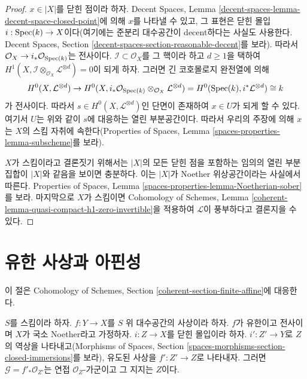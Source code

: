 \begin{proof}
\medskip\noindent
$x \in |X|$를 닫힌 점이라 하자. Decent Spaces, Lemma
\ref{decent-spaces-lemma-decent-space-closed-point}에 의해 $x$를 나타낼 수
있고, 그 표현은 닫힌 몰입 $i : \mathop{\mathrm{Spec}}(k) \to X$이다(여기에는 준분리
대수공간이 decent하다는 사실도 사용한다. Decent Spaces, Section
\ref{decent-spaces-section-reasonable-decent}를 보라). 따라서
$\mathcal{O}_X \to i_*\mathcal{O}_{\mathop{\mathrm{Spec}}(k)}$는 전사이다.
$\mathcal{I} \subset \mathcal{O}_X$를 그 핵이라 하고
$d \geq 1$을 택하여
$H^1(X, \mathcal{I} \otimes_{\mathcal{O}_X}
\mathcal{L}^{\otimes d}) = 0$이 되게 하자. 그러면 긴 코호몰로지 완전열에
의해
$$
H^0(X, \mathcal{L}^{\otimes d}) \to
H^0(X,
i_*\mathcal{O}_{\mathop{\mathrm{Spec}}(k)} \otimes_{\mathcal{O}_X} \mathcal{L}^{\otimes d}) =
H^0(\mathop{\mathrm{Spec}}(k), i^*\mathcal{L}^{\otimes d}) \cong k
$$
가 전사이다. 따라서 $s \in H^0(X, \mathcal{L}^{\otimes d})$인 단면이
존재하여 $x \in U$가 되게 할 수 있다. 여기서 $U$는 위와 같이
$s$에 대응하는 열린 부분공간이다. 따라서 우리의 주장에 의해 $x$는
$X$의 스킴 자취에 속한다(Properties of Spaces, Lemma
\ref{spaces-properties-lemma-subscheme}를 보라).

\medskip\noindent
$X$가 스킴이라고 결론짓기 위해서는 $|X|$의 모든 닫힌 점을 포함하는
임의의 열린 부분집합이 $|X|$와 같음을 보이면 충분하다. 이는 $|X|$가
Noether 위상공간이라는 사실에서 따른다. Properties of Spaces, Lemma
\ref{spaces-properties-lemma-Noetherian-sober}를 보라. 마지막으로 $X$가
스킴이면 Cohomology of Schemes, Lemma
\ref{coherent-lemma-quasi-compact-h1-zero-invertible}을 적용하여
$\mathcal{L}$이 풍부하다고 결론지을 수 있다.
\end{proof}









\section{유한 사상과 아핀성}
\label{section-finite-affine}

\noindent
이 절은 Cohomology of Schemes, Section
\ref{coherent-section-finite-affine}에 대응한다.

\begin{lemma}
\label{lemma-finite-morphism-Noetherian}
$S$를 스킴이라 하자. $f : Y \to X$를 $S$ 위 대수공간의 사상이라 하자.
$f$가 유한이고 전사이며 $X$가 국소 Noether라고 가정하자.
$i : Z \to X$를 닫힌 몰입이라 하자.
$i' : Z' \to Y$로 $Z$의 역상을 나타내고(Morphisms of Spaces,
Section \ref{spaces-morphisms-section-closed-immersions}를 보라), 유도된
사상을 $f' : Z' \to Z$로 나타내자. 그러면
$\mathcal{G} = f'_*\mathcal{O}_{Z'}$는 연접 $\mathcal{O}_Z$-가군이고
그 지지는 $Z$이다.
\end{lemma}

